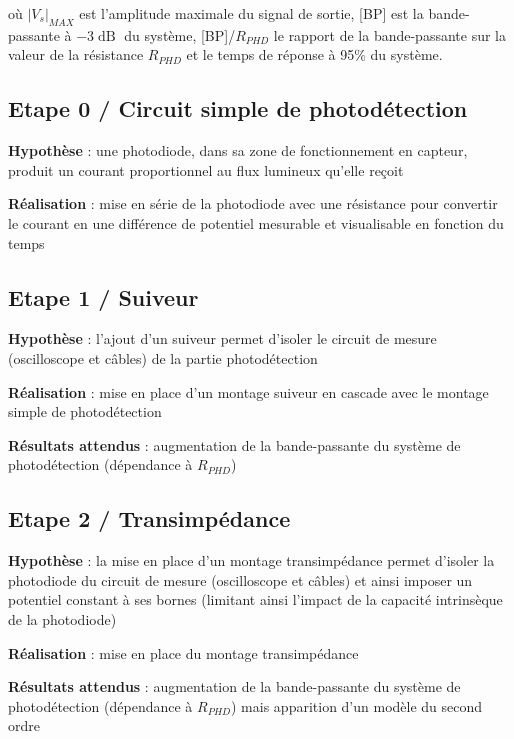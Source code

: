 où $|V_s|_{MAX}$ est l'amplitude maximale du signal de sortie, [BP] est la bande-passante à $-3\operatorname{dB}$ du système, [BP]/$R_{PHD}$ le rapport de la bande-passante sur la valeur de la résistance $R_{PHD}$ et le temps de réponse à 95\% du système.

\bigskip

\subsection{Etape 0 / Circuit simple de photodétection}

\textbf{Hypothèse} : une photodiode, dans sa zone de fonctionnement en capteur, produit un courant proportionnel au flux lumineux qu'elle reçoit

\textbf{Réalisation} : mise en série de la photodiode avec une résistance pour convertir le courant en une différence de potentiel mesurable et visualisable en fonction du temps

\newpage
\subsection{Etape 1 / Suiveur}

\textbf{Hypothèse} : l'ajout d'un suiveur permet d'isoler le circuit de mesure (oscilloscope et câbles) de la partie photodétection

\textbf{Réalisation} : mise en place d'un montage suiveur en cascade avec le montage simple de photodétection

\textbf{Résultats attendus} : augmentation de la bande-passante du système de photodétection (dépendance à $R_{PHD}$)



\subsection{Etape 2 / Transimpédance}


\textbf{Hypothèse} : la mise en place d'un montage transimpédance permet d'isoler la photodiode du circuit de mesure (oscilloscope et câbles) et ainsi imposer un potentiel constant à ses bornes (limitant ainsi l'impact de la capacité intrinsèque de la photodiode)

\textbf{Réalisation} : mise en place du montage transimpédance

\textbf{Résultats attendus} : augmentation de la bande-passante du système de photodétection (dépendance à $R_{PHD}$) mais apparition d'un modèle du second ordre

